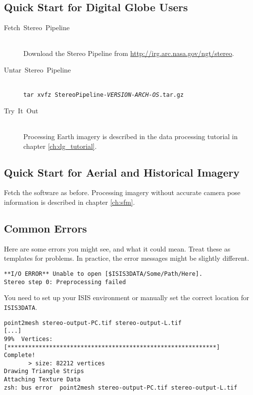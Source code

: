 \subsection{Quick Start for Digital Globe Users}
\label{quickstartDG}
\begin{description}

\item[{Fetch~Stereo~Pipeline}] ~\\
Download the Stereo Pipeline from \url{http://irg.arc.nasa.gov/ngt/stereo}.

\item[{Untar~Stereo~Pipeline}] ~\\
\texttt{tar xvfz StereoPipeline-\textit{VERSION-ARCH-OS}.tar.gz}

\item [{Try~It~Out}] ~\\
Processing Earth imagery is described in the data processing tutorial
in chapter \ref{ch:dg_tutorial}.

\end{description}

\subsection{Quick Start for Aerial and Historical Imagery}
\label{quickstartAerial}

Fetch the software as before. Processing imagery without accurate camera
pose information is described in chapter \ref{ch:sfm}.

\subsection{Common Errors}

Here are some errors you might see, and what it could mean. Treat
these as templates for problems.  In practice, the error messages might
be slightly different.

\begin{verbatim}
**I/O ERROR** Unable to open [$ISIS3DATA/Some/Path/Here].
Stereo step 0: Preprocessing failed
\end{verbatim}

You need to set up your ISIS environment or manually set the correct
location for \texttt{ISIS3DATA}.

\begin{verbatim}
point2mesh stereo-output-PC.tif stereo-output-L.tif
[...]
99%  Vertices:   [************************************************************] Complete!
       > size: 82212 vertices
Drawing Triangle Strips
Attaching Texture Data
zsh: bus error  point2mesh stereo-output-PC.tif stereo-output-L.tif
\end{verbatim}

